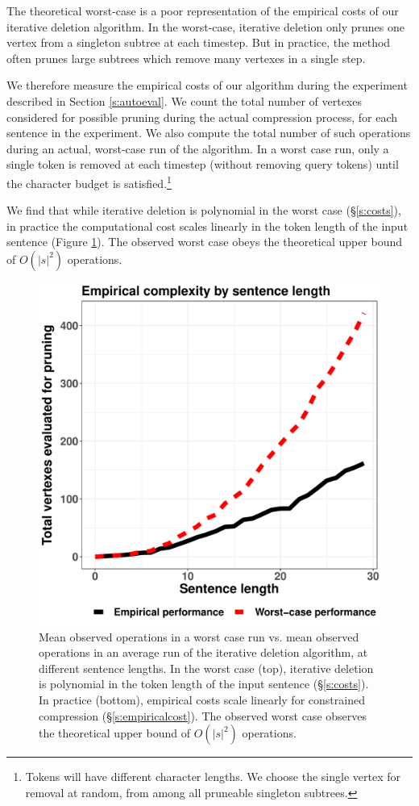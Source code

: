 \documentclass[11pt,a4paper]{article}
\begin{document}
The theoretical worst-case is a poor representation of the empirical costs of our iterative deletion algorithm. In the worst-case, iterative deletion only prunes one vertex from a singleton subtree at each timestep. But in practice, the method often prunes large subtrees which remove many vertexes in a single step. 


We therefore measure the empirical costs of our algorithm during the experiment described in Section \ref{s:autoeval}. We count the total number of vertexes considered for possible pruning during the actual compression process, for each sentence in the experiment. We also compute the total number of such operations during an actual, worst-case run of the algorithm. In a worst case run, only a single token is removed at each timestep (without removing query tokens) until the character budget is satisfied.\footnote{Tokens will have different character lengths. We choose the single vertex for removal at random, from among all pruneable singleton subtrees.} 

We find that while iterative deletion is polynomial in the worst case (\S\ref{s:costs}), in practice the computational cost scales linearly in the token length of the input sentence (Figure \ref{f:example}). The observed worst case obeys the theoretical upper bound of $O(|s|^2)$ operations.

\begin{figure}[htb!]
\centering
\includegraphics[width=.5\textwidth]{observed.pdf}
\caption{Mean observed operations in a worst case run vs. mean observed operations in an average run of the iterative deletion algorithm, at different sentence lengths. In the worst case (top), iterative deletion is polynomial in the token length of the input sentence (\S\ref{s:costs}). In practice (bottom), empirical costs scale linearly for constrained compression (\S\ref{s:empiricalcost}). The observed worst case observes the theoretical upper bound of $O(|s|^2)$ operations.}
\label{f:example}
\end{figure}
\end{document}
